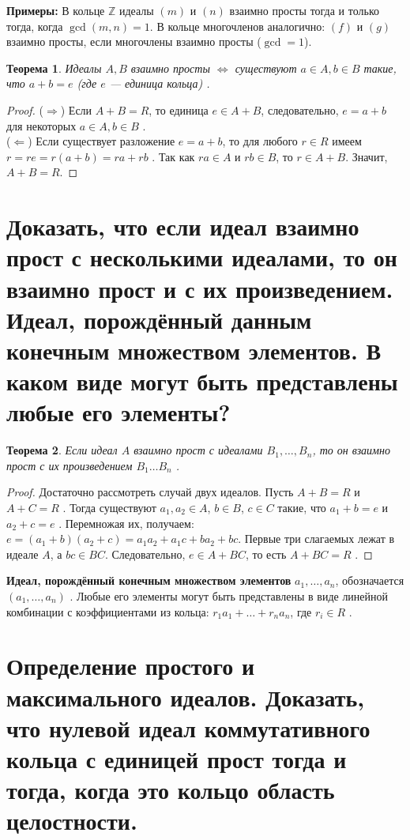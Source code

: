 \documentclass[12pt, a4paper]{article}
\theoremstyle{definition}
\theoremstyle{plain}
\newtheorem{theorem}{Теорема}[section]
\begin{document}
	\textbf{Примеры:} В кольце $\mathbb{Z}$ идеалы $(m)$ и $(n)$ взаимно просты тогда и только тогда, когда $\gcd(m,n)=1$. В кольце многочленов аналогично: $(f)$ и $(g)$ взаимно просты, если многочлены взаимно просты ($\gcd=1$).
	
	\begin{theorem}
		Идеалы $A, B$ взаимно просты $\iff$ существуют $a \in A, b \in B$ такие, что $a+b=e$ (где $e$ — единица кольца) .
	\end{theorem}
	\begin{proof}
		($\Rightarrow$) Если $A+B=R$, то единица $e \in A+B$, следовательно, $e = a+b$ для некоторых $a \in A, b \in B$ . \\
		($\Leftarrow$) Если существует разложение $e=a+b$, то для любого $r \in R$ имеем $r = re = r(a+b) = ra+rb$ . Так как $ra \in A$ и $rb \in B$, то $r \in A+B$. Значит, $A+B=R$.
	\end{proof}
	
	\newpage
	
	\section{Доказать, что если идеал взаимно прост с несколькими идеалами, то он взаимно прост и с их произведением. Идеал, порождённый данным конечным множеством элементов. В каком виде могут быть представлены любые его элементы?}
	
	\begin{theorem}
		Если идеал $A$ взаимно прост с идеалами $B_1, \dots, B_n$, то он взаимно прост с их произведением $B_1 \dots B_n$ .
	\end{theorem}
	\begin{proof}
		Достаточно рассмотреть случай двух идеалов. Пусть $A+B=R$ и $A+C=R$ . Тогда существуют $a_1, a_2 \in A$, $b \in B$, $c \in C$ такие, что $a_1+b=e$ и $a_2+c=e$ . Перемножая их, получаем: $e = (a_1+b)(a_2+c) = a_1 a_2 + a_1 c + b a_2 + bc$. Первые три слагаемых лежат в идеале $A$, а $bc \in BC$. Следовательно, $e \in A+BC$, то есть $A+BC=R$ .
	\end{proof}
	
	\textbf{Идеал, порождённый конечным множеством элементов} $a_1, \dots, a_n$, обозначается $(a_1, \dots, a_n)$ .
	Любые его элементы могут быть представлены в виде линейной комбинации с коэффициентами из кольца: $r_1 a_1 + \dots + r_n a_n$, где $r_i \in R$ .
	
	\newpage
	
	\section{Определение простого и максимального идеалов. Доказать, что нулевой идеал коммутативного кольца с единицей прост тогда и тогда, когда это кольцо область целостности.}
	
\end{document}
